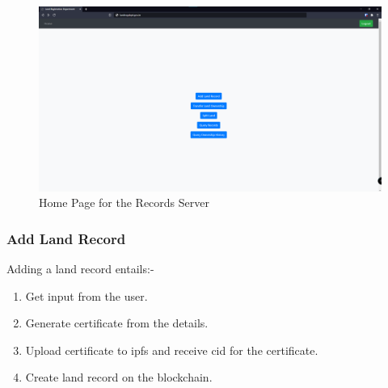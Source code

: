 \documentclass[12pt]{article}
\begin{document}
        \begin{figure}[htbp]
            \includegraphics[scale=0.25]{records_home}
            \centering
            \caption{Home Page for the Records Server}
        \end{figure}
        
        

        \subsubsection{Add Land Record}
            Adding a land record entails:-
            \begin{enumerate}
                \item Get input from the user.
                \item Generate certificate from the details.
                \item Upload certificate to \acrshort{ipfs} and receive \acrshort{cid} for the certificate.
                \item Create land record on the blockchain.
            \end{enumerate}
\end{document}
